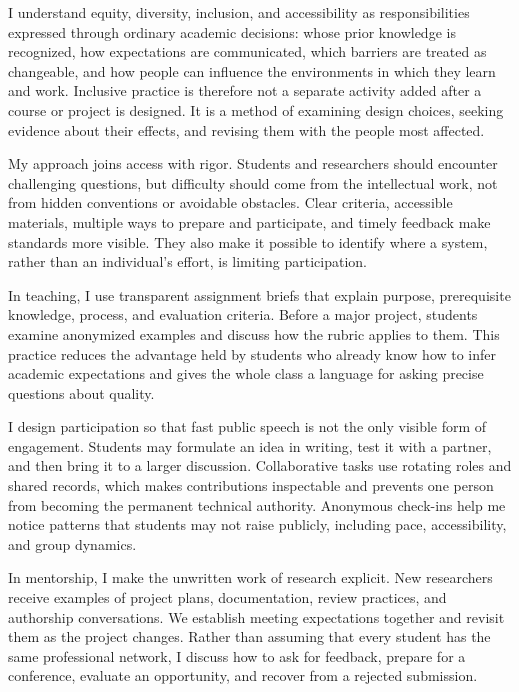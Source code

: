 \documentclass[type=diversity]{careerdossier-statement}
\begin{document}
\MakeCDossierStatementHeader


I understand equity, diversity, inclusion, and accessibility as responsibilities
expressed through ordinary academic decisions: whose prior knowledge is
recognized, how expectations are communicated, which barriers are treated as
changeable, and how people can influence the environments in which they learn
and work. Inclusive practice is therefore not a separate activity added after a
course or project is designed. It is a method of examining design choices,
seeking evidence about their effects, and revising them with the people most
affected.

My approach joins access with rigor. Students and researchers should encounter
challenging questions, but difficulty should come from the intellectual work,
not from hidden conventions or avoidable obstacles. Clear criteria, accessible
materials, multiple ways to prepare and participate, and timely feedback make
standards more visible. They also make it possible to identify where a system,
rather than an individual's effort, is limiting participation.


In teaching, I use transparent assignment briefs that explain purpose,
prerequisite knowledge, process, and evaluation criteria. Before a major
project, students examine anonymized examples and discuss how the rubric applies
to them. This practice reduces the advantage held by students who already know
how to infer academic expectations and gives the whole class a language for
asking precise questions about quality.

I design participation so that fast public speech is not the only visible form
of engagement. Students may formulate an idea in writing, test it with a partner,
and then bring it to a larger discussion. Collaborative tasks use rotating roles
and shared records, which makes contributions inspectable and prevents one
person from becoming the permanent technical authority. Anonymous check-ins
help me notice patterns that students may not raise publicly, including pace,
accessibility, and group dynamics.

In mentorship, I make the unwritten work of research explicit. New researchers
receive examples of project plans, documentation, review practices, and
authorship conversations. We establish meeting expectations together and revisit
them as the project changes. Rather than assuming that every student has the
same professional network, I discuss how to ask for feedback, prepare for a
conference, evaluate an opportunity, and recover from a rejected submission.
\end{document}
